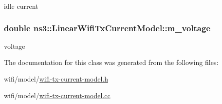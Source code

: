 idle current 

\subsubsection[{\texorpdfstring{m\+\_\+voltage}{m_voltage}}]{\setlength{\rightskip}{0pt plus 5cm}double ns3\+::\+Linear\+Wifi\+Tx\+Current\+Model\+::m\+\_\+voltage\hspace{0.3cm}{\ttfamily [private]}}\hypertarget{classns3_1_1LinearWifiTxCurrentModel_ab6d30871bdd27d1e1539c3e40e447339}{}\label{classns3_1_1LinearWifiTxCurrentModel_ab6d30871bdd27d1e1539c3e40e447339}


voltage 



The documentation for this class was generated from the following files\+:\begin{DoxyCompactItemize}
\item 
wifi/model/\hyperlink{wifi-tx-current-model_8h}{wifi-\/tx-\/current-\/model.\+h}\item 
wifi/model/\hyperlink{wifi-tx-current-model_8cc}{wifi-\/tx-\/current-\/model.\+cc}\end{DoxyCompactItemize}
